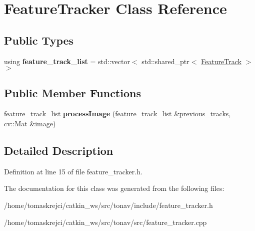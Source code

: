 \hypertarget{class_feature_tracker}{\section{Feature\-Tracker Class Reference}
\label{class_feature_tracker}
}
\subsection*{Public Types}
\begin{DoxyCompactItemize}
\item 
\hypertarget{class_feature_tracker_a8c26ba2ee4c3653c6082a6ceec345f8a}{using {\bfseries feature\-\_\-track\-\_\-list} = std\-::vector$<$ std\-::shared\-\_\-ptr$<$ \hyperlink{class_feature_track}{Feature\-Track} $>$$>$}\label{class_feature_tracker_a8c26ba2ee4c3653c6082a6ceec345f8a}

\end{DoxyCompactItemize}
\subsection*{Public Member Functions}
\begin{DoxyCompactItemize}
\item 
\hypertarget{class_feature_tracker_a1d44cc6cd06ced4f321d2ecebfd7b069}{feature\-\_\-track\-\_\-list {\bfseries process\-Image} (feature\-\_\-track\-\_\-list \&previous\-\_\-tracks, cv\-::\-Mat \&image)}\label{class_feature_tracker_a1d44cc6cd06ced4f321d2ecebfd7b069}

\end{DoxyCompactItemize}


\subsection{Detailed Description}


Definition at line 15 of file feature\-\_\-tracker.\-h.



The documentation for this class was generated from the following files\-:\begin{DoxyCompactItemize}
\item 
/home/tomaskrejci/catkin\-\_\-ws/src/tonav/include/feature\-\_\-tracker.\-h\item 
/home/tomaskrejci/catkin\-\_\-ws/src/tonav/src/feature\-\_\-tracker.\-cpp\end{DoxyCompactItemize}

